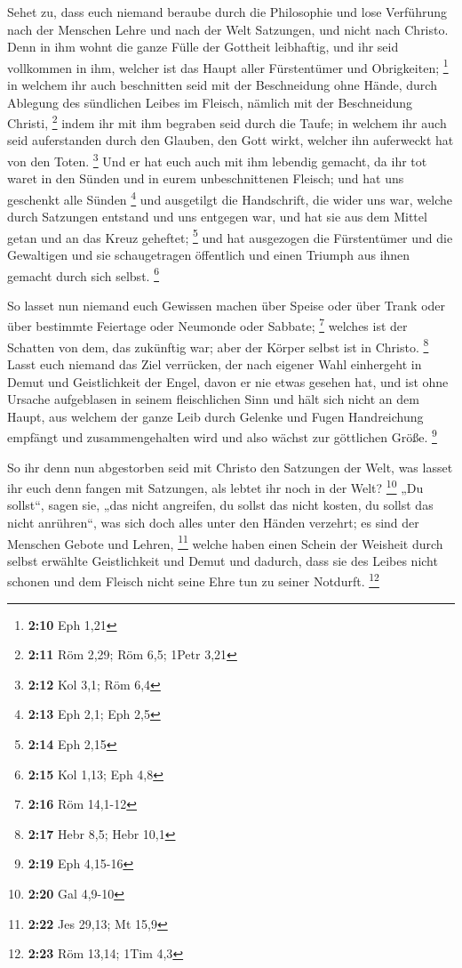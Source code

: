  Sehet zu, dass euch niemand beraube durch die Philosophie
und lose Verführung nach der Menschen Lehre und nach der Welt Satzungen,
und nicht nach Christo.  Denn in ihm wohnt die ganze Fülle
der Gottheit leibhaftig,  und ihr seid vollkommen in ihm,
welcher ist das Haupt aller Fürstentümer und Obrigkeiten; \footnote{\textbf{2:10}
  Eph 1,21}  in welchem ihr auch beschnitten seid mit der
Beschneidung ohne Hände, durch Ablegung des sündlichen Leibes im
Fleisch, nämlich mit der Beschneidung Christi, \footnote{\textbf{2:11}
  Röm 2,29; Röm 6,5; 1Petr 3,21}  indem ihr mit ihm
begraben seid durch die Taufe; in welchem ihr auch seid auferstanden
durch den Glauben, den Gott wirkt, welcher ihn auferweckt hat von den
Toten. \footnote{\textbf{2:12} Kol 3,1; Röm 6,4}  Und er
hat euch auch mit ihm lebendig gemacht, da ihr tot waret in den Sünden
und in eurem unbeschnittenen Fleisch; und hat uns geschenkt alle Sünden
\footnote{\textbf{2:13} Eph 2,1; Eph 2,5}  und ausgetilgt
die Handschrift, die wider uns war, welche durch Satzungen entstand und
uns entgegen war, und hat sie aus dem Mittel getan und an das Kreuz
geheftet; \footnote{\textbf{2:14} Eph 2,15}  und hat
ausgezogen die Fürstentümer und die Gewaltigen und sie schaugetragen
öffentlich und einen Triumph aus ihnen gemacht durch sich selbst.
\footnote{\textbf{2:15} Kol 1,13; Eph 4,8}

 So lasset nun niemand euch Gewissen machen über Speise
oder über Trank oder über bestimmte Feiertage oder Neumonde oder
Sabbate; \footnote{\textbf{2:16} Röm 14,1-12}  welches ist
der Schatten von dem, das zukünftig war; aber der Körper selbst ist in
Christo. \footnote{\textbf{2:17} Hebr 8,5; Hebr 10,1} 
Lasst euch niemand das Ziel verrücken, der nach eigener Wahl einhergeht
in Demut und Geistlichkeit der Engel, davon er nie etwas gesehen hat,
und ist ohne Ursache aufgeblasen in seinem fleischlichen Sinn
 und hält sich nicht an dem Haupt, aus welchem der ganze
Leib durch Gelenke und Fugen Handreichung empfängt und zusammengehalten
wird und also wächst zur göttlichen Größe. \footnote{\textbf{2:19} Eph
  4,15-16}

 So ihr denn nun abgestorben seid mit Christo den Satzungen
der Welt, was lasset ihr euch denn fangen mit Satzungen, als lebtet ihr
noch in der Welt? \footnote{\textbf{2:20} Gal 4,9-10}  „Du
sollst``, sagen sie, „das nicht angreifen, du sollst das nicht kosten,
du sollst das nicht anrühren``,  was sich doch alles unter
den Händen verzehrt; es sind der Menschen Gebote und Lehren, \footnote{\textbf{2:22}
  Jes 29,13; Mt 15,9}  welche haben einen Schein der
Weisheit durch selbst erwählte Geistlichkeit und Demut und dadurch, dass
sie des Leibes nicht schonen und dem Fleisch nicht seine Ehre tun zu
seiner Notdurft. \footnote{\textbf{2:23} Röm 13,14; 1Tim 4,3}

